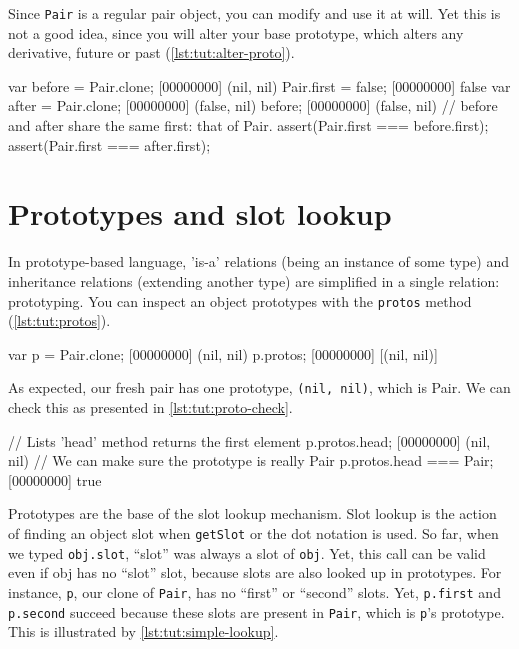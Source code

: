 Since \lstinline|Pair| is a regular pair object, you can modify and
use it at will. Yet this is not a good idea, since you will alter your
base prototype, which alters any derivative, future or past
(\autoref{lst:tut:alter-proto}).

\begin{urbiscript}[caption=Altering a prototype, label=lst:tut:alter-proto]
var before = Pair.clone;
[00000000] (nil, nil)
Pair.first = false;
[00000000] false
var after = Pair.clone;
[00000000] (false, nil)
before;
[00000000] (false, nil)
// before and after share the same first: that of Pair.
assert(Pair.first === before.first);
assert(Pair.first === after.first);
\end{urbiscript}

\section{Prototypes and slot lookup}

In prototype-based language, 'is-a' relations (being an instance of
some type) and inheritance relations (extending another type) are
simplified in a single relation: prototyping. You can inspect an
object prototypes with the \lstinline{protos} method (\autoref{lst:tut:protos}).

\begin{urbiscript}[caption=Inspecting prototypes, label=lst:tut:protos,
  name=protos]
var p = Pair.clone;
[00000000] (nil, nil)
p.protos;
[00000000] [(nil, nil)]
\end{urbiscript}

As expected, our fresh pair has one prototype, \lstinline|(nil, nil)|,
which is Pair. We can check this as presented in \autoref{lst:tut:proto-check}.

\begin{urbiscript}[caption=Checking the prototype,
  label=lst:tut:proto-check, name=protos]
// Lists 'head' method returns the first element
p.protos.head;
[00000000] (nil, nil)
// We can make sure the prototype is really Pair
p.protos.head === Pair;
[00000000] true
\end{urbiscript}

Prototypes are the base of the slot lookup mechanism. Slot lookup is
the action of finding an object slot when \lstinline{getSlot} or the dot
notation is used. So far, when we typed \lstinline|obj.slot|, ``slot''
was always a slot of \lstinline|obj|.
Yet, this call can be valid even if obj has
no ``slot'' slot, because slots are also looked up in prototypes. For
instance, \lstinline|p|, our clone of \lstinline|Pair|, has no
``first'' or ``second'' slots. Yet, \lstinline|p.first| and
\lstinline|p.second| succeed because these slots are present in
\lstinline|Pair|, which is \lstinline|p|'s prototype. This is
illustrated by \autoref{lst:tut:simple-lookup}.

